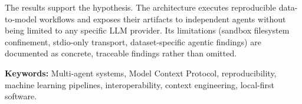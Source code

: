 The results support the hypothesis. The architecture executes reproducible data-to-model workflows and exposes their artifacts to independent agents without being limited to any specific LLM provider. Its limitations (sandbox filesystem confinement, stdio-only transport, dataset-specific agentic findings) are documented as concrete, traceable findings rather than omitted.

\textbf{Keywords:} Multi-agent systems, Model Context Protocol, reproducibility, machine learning pipelines, interoperability, context engineering, local-first software.
